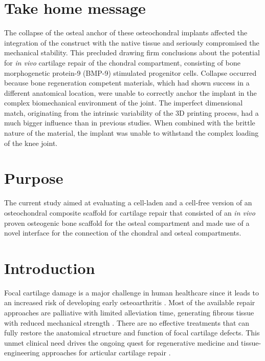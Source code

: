 \documentclass[twocolumn, serif, empirical, authordate, seplic]{jote-article}
\begin{document}
 {}\section*{Take home message} 

The collapse of the osteal anchor of these osteochondral implants affected the integration of the construct with the native tissue and seriously compromised the mechanical stability. This precluded drawing firm conclusions about the potential for \emph{in vivo} cartilage repair of the chondral compartment, consisting of bone morphogenetic protein-9 (BMP-9) stimulated progenitor cells. Collapse occurred because bone regeneration competent materials, which had shown success in a different anatomical location, were unable to correctly anchor the implant in the complex biomechanical environment of the joint. The imperfect dimensional match, originating from the intrinsic variability of the 3D printing process, had a much bigger influence than in previous studies. When combined with the brittle nature of the material, the implant was unable to withstand the complex loading of the knee joint.

 {}\section*{Purpose} 

The current study aimed at evaluating a cell-laden and a cell-free version of an osteochondral composite scaffold for cartilage repair that consisted of an \emph{in vivo} proven osteogenic bone scaffold for the osteal compartment and made use of a novel interface for the connection of the chondral and osteal compartments.

 {}\section*{Introduction} 

Focal cartilage damage is a major challenge in human healthcare since it leads to an increased risk of developing early osteoarthritis \parencite{Kloppenburg2020}. Most of the available repair approaches are palliative with limited alleviation time, generating fibrous tissue with reduced mechanical strength \parencite{Kwon2019}. There are no effective treatments that can fully restore the anatomical structure and function of focal cartilage defects. This unmet clinical need drives the ongoing quest for regenerative medicine and tissue-engineering approaches for articular cartilage repair \parencite{Malda2019}.
\end{document}
